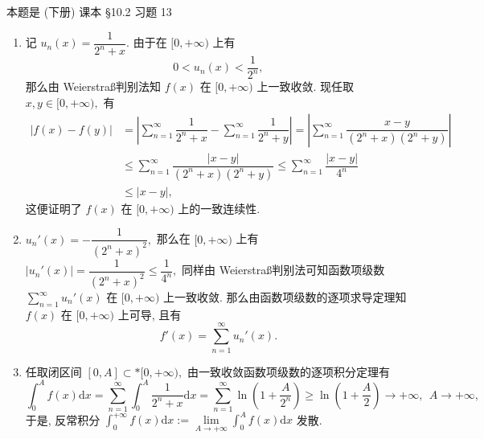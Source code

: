 \begin{solution}
本题是 (下册) 课本 \S 10.2 习题 13

\begin{enumerate}
\item 记 $u_n(x) = \dfrac{1}{2^n + x}.$ 由于在 $[0, +\infty)$ 上有
$$0 < u_n(x) < \dfrac{1}{2^n},$$
那么由 Weierstra\ss 判别法知 $f(x)$ 在 $[0, +\infty)$ 上一致收敛. 现任取 $x, y \in [0, +\infty),$ 有
\begin{align*}
  \lvert f(x) - f(y) \rvert & = \left\lvert \sum\limits_{n=1}^\infty \dfrac{1}{2^n + x} - \sum\limits_{n=1}^\infty \dfrac{1}{2^n + y} \right\rvert = \left\lvert \sum\limits_{n=1}^\infty \dfrac{x - y}{(2^n + x)(2^n + y)} \right\rvert \\
  & \leqslant \sum\limits_{n=1}^\infty \dfrac{\lvert x - y \rvert}{(2^n + x)(2^n + y)} \leqslant \sum\limits_{n=1}^\infty \dfrac{\lvert x - y \rvert}{4^n} \\
  & \leqslant \lvert x - y \rvert,
\end{align*}
这便证明了 $f(x)$ 在 $[0, +\infty)$ 上的一致连续性.
\item $u_n'(x) = -\dfrac{1}{\left(2^n + x\right)^2},$ 那么在 $[0, +\infty)$ 上有 $\lvert u_n'(x) \rvert = \dfrac{1}{\left(2^n + x\right)^2} \leqslant \dfrac{1}{4^n},$ 同样由 Weierstra\ss 判别法可知函数项级数 $\sum\limits_{n=1}^\infty u_n'(x)$ 在 $[0, +\infty)$ 上一致收敛. 那么由函数项级数的逐项求导定理知 $f(x)$ 在 $[0, +\infty)$ 上可导, 且有
$$f'(x) = \sum\limits_{n=1}^\infty u_n'(x).$$
\item 任取闭区间 $[0, A] \subset* [0, +\infty),$ 由一致收敛函数项级数的逐项积分定理有
$$\int_0^{A} f(x) \mathrm{d} x = \sum\limits_{n=1}^\infty \int_0^{A} \dfrac{1}{2^n + x} \mathrm{d} x = \sum\limits_{n=1}^\infty \ln \left( 1 + \dfrac{A}{2^n} \right) \geqslant \ln \left( 1 + \dfrac{A}{2} \right) \to +\infty, ~~ A \to +\infty,$$
于是, 反常积分 $\int_0^{+\infty} f(x) \mathrm{d} x := \lim\limits_{A \to +\infty} \int_0^{A} f(x) \mathrm{d} x$ 发散.
\end{enumerate}
\end{solution}


